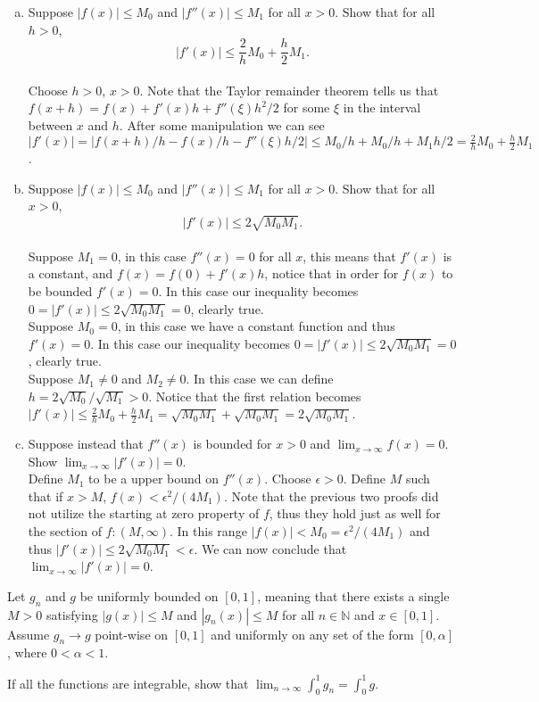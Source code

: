 \documentclass[12pt]{article}
\makeatletter
\theoremstyle{homework}
\newenvironment{exercise}[1]
{\def\@currentlabel{#1}\exercisecore}
{\endexercisecore}
\newcommand{\Nats}{\ensuremath{\mathbb N}}
\let\NN\Nats
\makeatother
\begin{document}
\begin{enumerate}[(a)]
\item Suppose $|f(x)|\le M_0$ and $|f''(x)|\le M_1$ for all $x>0$. Show that for all $h>0$, $$|f'(x)|\le \frac{2}{h}M_0 + \frac{h}{2}M_1.$$\\
Choose $h>0$, $x>0$.  Note that the Taylor remainder theorem tells us that $f(x+h)=f(x)+f'(x)h+f''(\xi)h^2/2$ for some $\xi$ in the interval between $x$ and $h$.  After some manipulation we can see $|f'(x)|=|f(x+h)/h-f(x)/h-f''(\xi)h/2|\leq M_0/h+M_0/h+M_1h/2=\frac{2}{h}M_0 + \frac{h}{2}M_1$.
\item Suppose $|f(x)|\le M_0$ and $|f''(x)|\le M_1$ for all $x>0$. Show that for all $x>0$, $$|f'(x)|\le 2\sqrt{M_0M_1}.$$\\
Suppose $M_1=0$, in this case $f''(x)=0$ for all $x$, this means that $f'(x)$ is a constant, and $f(x)=f(0)+f'(x)h$, notice that in order for $f(x)$ to be bounded $f'(x)=0$.  In this case our inequality becomes $0=|f'(x)|\le 2\sqrt{M_0M_1}=0$, clearly true.\\
Suppose $M_0=0$, in this case we have a constant function and thus $f'(x)=0$.  In this case our inequality becomes $0=|f'(x)|\le 2\sqrt{M_0M_1}=0$, clearly true.\\
Suppose $M_1\neq 0$ and $M_2\neq 0$.  In this case we can define $h=2\sqrt{M_0}/\sqrt{M_1}>0$.  Notice that the first relation becomes $|f'(x)|\leq \frac{2}{h}M_0 + \frac{h}{2}M_1=\sqrt{M_0M_1} + \sqrt{M_0M_1}=2\sqrt{M_0M_1}$.
\item Suppose instead that $f''(x)$ is bounded for $x>0$ and $\lim_{x\to\infty} f(x)=0$. Show $\lim_{x\to\infty}|f'(x)|=0$.\\
Define $M_1$ to be a upper bound on $f''(x)$.  Choose $\epsilon>0$.  Define $M$ such that if $x>M$, $f(x)<\epsilon^2/(4M_1)$.  Note that the previous two proofs did not utilize the starting at zero property of $f$, thus they hold just as well for the section of $f: (M,\infty)$.  In this range $|f(x)|<M_0=\epsilon^2/(4M_1)$ and thus $|f'(x)|\le 2\sqrt{M_0M_1}<\epsilon$.  We can now conclude that $\lim_{x\to\infty}|f'(x)|=0$.
\end{enumerate}
\begin{exercise}
{11}
Let $g_n$ and $g$ be uniformly bounded on $[0,1]$, meaning that there exists a single $M>0$ satisfying $|g(x)|\le M$ and $|g_n(x)|\le M$ for all $n \in \NN$ and $x \in [0,1]$. Assume $g_n \to g$ point-wise on $[0,1]$ and uniformly on any set of the form $[0,\alpha]$, where $0 < \alpha<1$.

If all the functions are integrable, show that $\lim_{n\to\infty}\int_0^1 g_n = \int_0^1 g$.
\end{exercise}
\end{document}
